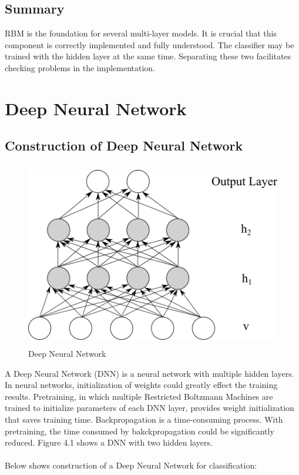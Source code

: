 \documentclass[12pt]{article}
\begin{document}
\subsection{Summary}
RBM is the foundation for several multi-layer models. It is crucial that this component is correctly implemented and fully understood. The classifier may be trained with the hidden layer at the same time. Separating these two facilitates checking problems in the implementation.
\clearpage
\section{Deep Neural Network}
\subsection{Construction of Deep Neural Network}
\begin{figure}[h]
\centering
\includegraphics[height=3.2in]{DNN.png}
\caption{Deep Neural Network} \label{fig:side:a}
\end{figure}
A Deep Neural Network (DNN) is a neural network with multiple hidden layers. In neural networks, initialization of weights could greatly effect the training results. Pretraining, in which multiple Restricted Boltzmann Machines are trained to initialize parameters of each DNN layer, provides weight initialization that saves training time. Backpropagation is a time-consuming process. With pretraining, the time consumed by bakckpropagation could be significantly reduced. Figure 4.1 shows a DNN with two hidden layers.\\
\\
Below shows construction of a Deep Neural Network for classification:\\
\\
\end{document}
